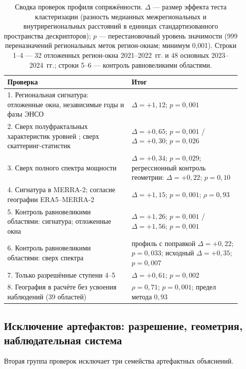 \documentclass[11pt,a4paper]{article}
\begin{document}
\begin{table}[H]
\centering
\caption{Сводка проверок профиля сопряжённости. $\Delta$ --- размер эффекта теста кластеризации (разность медианных межрегиональных и внутрирегиональных расстояний в единицах стандартизованного пространства дескрипторов); $p$ --- перестановочный уровень значимости (999 переназначений региональных меток регион-окнам; минимум 0,001). Строки 1--4 --- 32 отложенных регион-окна 2021--2022~гг. и 48 основных 2023--2024~гг.; строки 5--6 --- контроль равновеликими областями.}
\label{tab:tests}
\small
\begin{tabular}{@{}p{0.50\linewidth}p{0.44\linewidth}@{}}
\toprule
Проверка & Итог\\
\midrule
1. Региональная сигнатура: отложенные окна, независимые годы и фазы ЭНСО & $\Delta=+1{,}12$; $p=0{,}001$\\
2. Сверх полуфрактальных характеристик уровней \cite{Krenke2019}; сверх скаттеринг-статистик \cite{Cheng2024} & $\Delta=+0{,}65$; $p=0{,}001$ / $\Delta=+0{,}30$; $p=0{,}026$\\
3. Сверх полного спектра мощности & $\Delta=+0{,}34$; $p=0{,}029$; регрессионный контроль геометрии: $\Delta=+0{,}22$; $p=0{,}10$\\
4. Сигнатура в MERRA-2; согласие географии ERA5--MERRA-2 & $\Delta=+1{,}15$; $p=0{,}001$; $\rho=0{,}93$\\
5. Контроль равновеликими областями: сигнатура; отложенные окна & $\Delta=+1{,}26$; $p=0{,}001$ / $\Delta=+1{,}56$; $p=0{,}001$\\
6. Контроль равновеликими областями: сверх спектра & профиль с поправкой $\Delta=+0{,}22$; $p=0{,}033$; исходный $\Delta=+0{,}35$; $p=0{,}007$\\
7. Только разрешённые ступени 4--5 & $\Delta=+0{,}61$; $p=0{,}002$\\
8. География в расчёте без усвоения наблюдений (39 областей) & $\rho=0{,}71$; $p=0{,}001$; предел метода $0{,}93$\\
\bottomrule
\end{tabular}
\end{table}

\subsection{Исключение артефактов: разрешение, геометрия, наблюдательная система}
\label{sec:artifacts}

Вторая группа проверок исключает три семейства артефактных объяснений.
\end{document}
